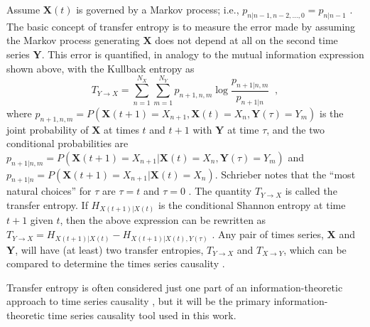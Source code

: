 \documentclass{article}[10pt]
\begin{document}
Assume $\mathbf{X}(t)$ is governed by a Markov process; i.e., $p_{n|n-1,n-2,\ldots,0} = p_{n|n-1}$ \cite{statsbook_placeholder}.  The basic concept of transfer entropy is to measure the error made by assuming the Markov process generating $\mathbf{X}$ does not depend at all on the second time series $\mathbf{Y}$.  This error is quantified, in analogy to the mutual information expression shown above, with the Kullback entropy as
\begin{equation}
\label{eqn:TE}
T_{Y\rightarrow X} = \sum_{n=1}^{N_X} \sum_{m=1}^{N_Y} p_{n+1,n,m}\log \frac{p_{n+1|n,m}}{p_{n+1|n}}\;\;,
\end{equation}
where $p_{n+1,n,m} = P(\mathbf{X}(t+1)=X_{n+1},\mathbf{X}(t)=X_n,\mathbf{Y}(\tau)=Y_m)$ is the joint probability of $\mathbf{X}$ at times $t$ and $t+1$ with $\mathbf{Y}$ at time $\tau$, and the two conditional probabilities are $p_{n+1|n,m} = P(\mathbf{X}(t+1)=X_{n+1}|\mathbf{X}(t)=X_n,\mathbf{Y}(\tau)=Y_m)$ and $p_{n+1|n} = P(\mathbf{X}(t+1)=X_{n+1}|\mathbf{X}(t)=X_n)$.  Schrieber notes that the ``most natural choices'' for $\tau$ are $\tau=t$ and $\tau=0$ \cite{Schreiber2000}.  The quantity $T_{Y\rightarrow X}$ is called the transfer entropy.  If $H_{X(t+1)|X(t)}$ is the conditional Shannon entropy at time $t+1$ given $t$, then the above expression can be rewritten as $T_{Y\rightarrow X} = H_{X(t+1)|X(t)}-H_{X(t+1)|X(t),Y(\tau)}$ \cite{Kaiser2002}.  Any pair of times series, $\mathbf{X}$ and $\mathbf{Y}$, will have (at least) two transfer entropies, $T_{Y\rightarrow X}$ and $T_{X\rightarrow Y}$, which can be compared to determine the times series causality \cite{Schreiber2000}.  

Transfer entropy is often considered just one part of an information-theoretic approach to time series causality \cite{Schindler2007}, but it will be the primary information-theoretic time series causality tool used in this work.
\end{document}
